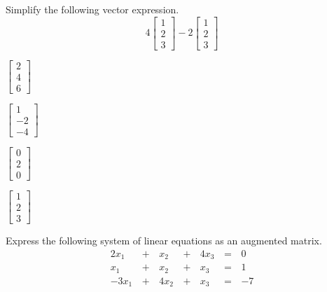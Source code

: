 \documentclass{article}
\begin{document}
\begin{readinessAssuranceTest}
\setcounter{enumi}{20}
\item Simplify the following vector expression.
  \[
  4
  \begin{bmatrix}
    1 \\ 2 \\ 3
  \end{bmatrix}-
  2
  \begin{bmatrix}
    1 \\ 2 \\ 3
  \end{bmatrix}
  \]

\begin{multicols}{4}
\begin{readinessAssuranceTestChoices}
\item \(
        \begin{bmatrix}
          2 \\ 4 \\ 6
        \end{bmatrix}
      \) %
\item \(
        \begin{bmatrix}
          1 \\ -2 \\ -4
        \end{bmatrix}
      \)
\item \(
        \begin{bmatrix}
          0 \\ 2 \\ 0
        \end{bmatrix}
      \)
\item \(
        \begin{bmatrix}
          1 \\ 2 \\ 3
        \end{bmatrix}
      \)
\end{readinessAssuranceTestChoices}
\end{multicols}

\item Express the following system of linear equations as an augmented matrix.
\begin{alignat*}{4}
  2x_1 &\,+\,& x_2 &\,+\,& 4x_3 &\,=\,& 0 \\
   x_1 &\,+\,& x_2 &\,+\,&  x_3 &\,=\,& 1 \\
 -3x_1 &\,+\,& 4x_2 &\,+\,& x_3 &\,=\,& -7 \\
\end{alignat*}


\end{readinessAssuranceTest}
\end{document}
